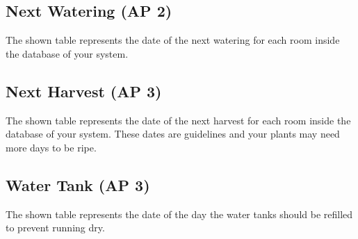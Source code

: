 \subsection{Next Watering (AP 2)}
The shown table represents the date of the next watering for each room inside
the database of your system.

\subsection{Next Harvest (AP 3)}
The shown table represents the date of the next harvest for each room inside
the database of your system. These dates are guidelines and your plants may need
more days to be ripe.

\subsection{Water Tank (AP 3)}
The shown table represents the date of the day the water tanks should be
refilled to prevent running dry.

